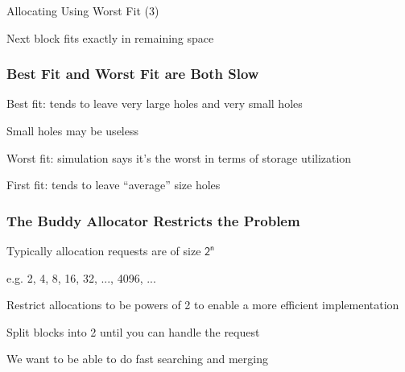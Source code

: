   \begin{frame}{Allocating Using Worst Fit (3)}

    Next block fits exactly in remaining space
  \end{frame}

  \begin{frame}
    \frametitle{Best Fit and Worst Fit are Both Slow}

    Best fit: tends to leave very large holes and very small holes

    \hspace{2em} Small holes may be useless

    \vspace{2em}

    Worst fit: simulation says it's the worst in terms of storage utilization

    \vspace{2em}

    First fit: tends to leave ``average'' size holes
  \end{frame}

  \begin{frame}
    \frametitle{The Buddy Allocator Restricts the Problem}

    Typically allocation requests are of size $\mathsf{2^n}$

    \hspace{2em} e.g. 2, 4, 8, 16, 32, ..., 4096, ...

    \vspace{2em}

    Restrict allocations to be powers of 2 to enable a more efficient
    implementation

    \hspace{2em} Split blocks into 2 until you can handle the request

    \vspace{2em}

    We want to be able to do fast searching and merging
  \end{frame}

